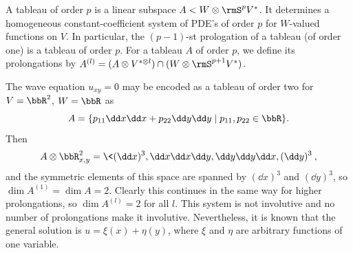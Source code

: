 \begin{defn}
    A tableau of order $p$ is a linear subspace $A<W\otimes\rmS^p V^\ast$. It determines a homogeneous constant-coefficient system of PDE's of order $p$ for $W$-valued functions on $V$. In particular, the $(p-1)$-st prologation of a tableau (of order one) is a tableau of order $p$. For a tableau $A$ of order $p$, we define its prolongations by $A^{(l)}=(A\otimes V^{\ast \otimes l})\cap (W\otimes \rmS^{p+1}V^\ast)$.
\end{defn}

\begin{example}
    The wave equation $u_{xy}=0$ may be encoded as a tableau of order two for $V=\bbR^2$, $W=\bbR$ as 
    \[A=\{p_{11}\dd x\dd x+p_{22}\dd y\dd y\mid p_{11},p_{22}\in\bbR\}.\]
    Then 
    \[A\otimes\bbR^2_{x,y}=\<(\dd x)^3,\dd x\dd x\dd y,\dd y\dd y \dd x,(\dd y)^3\>,\]
    and the symmetric elements of this space are spanned by $(\dd x)^3$ and $(\dd y)^3$, so $\dim A^{(1)}=\dim A=2$. Clearly this continues in the same way for higher prolongations, so $\dim A^{(l)}=2$ for all $l$. This system is not involutive and no number of prolongations make it involutive. Nevertheless, it is known that the general solution is $u=\xi(x)+\eta(y)$, where $\xi$ and $\eta$ are arbitrary functions of one variable.
\end{example}





